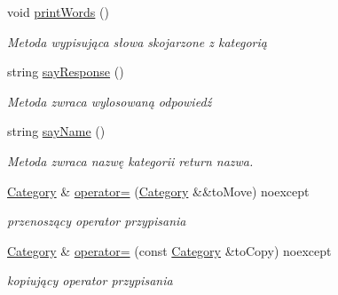 \begin{DoxyCompactItemize}
$$void \mbox{\hyperlink{class_category_a41ded06538a3b672e77f0444a46c8db3}{print\+Words}} ()
\begin{DoxyCompactList}\small\item\em Metoda wypisująca słowa skojarzone z kategorią \end{DoxyCompactList}\item 
string \mbox{\hyperlink{class_category_ac2902099aab40f2f7a0283eb955981ac}{say\+Response}} ()
\begin{DoxyCompactList}\small\item\em Metoda zwraca wylosowaną odpowiedź \end{DoxyCompactList}\item 
\mbox{\label{class_category_aa374027f025754a4672273b32b28c1d9}} 
string \mbox{\hyperlink{class_category_aa374027f025754a4672273b32b28c1d9}{say\+Name}} ()
\begin{DoxyCompactList}\small\item\em Metoda zwraca nazwę kategorii return nazwa. \end{DoxyCompactList}\item 
\mbox{\label{class_category_a8fb6819ce1e965633a44a309fd7bcc6c}} 
\mbox{\hyperlink{class_category}{Category}} \& \mbox{\hyperlink{class_category_a8fb6819ce1e965633a44a309fd7bcc6c}{operator=}} (\mbox{\hyperlink{class_category}{Category}} \&\&to\+Move) noexcept
\begin{DoxyCompactList}\small\item\em przenoszący operator przypisania \end{DoxyCompactList}\item 
\mbox{\label{class_category_a8855e1b941dd21b1cdb573139fbdfd3e}} 
\mbox{\hyperlink{class_category}{Category}} \& \mbox{\hyperlink{class_category_a8855e1b941dd21b1cdb573139fbdfd3e}{operator=}} (const \mbox{\hyperlink{class_category}{Category}} \&to\+Copy) noexcept
\begin{DoxyCompactList}\small\item\em kopiujący operator przypisania \end{DoxyCompactList}\end{DoxyCompactItemize}
